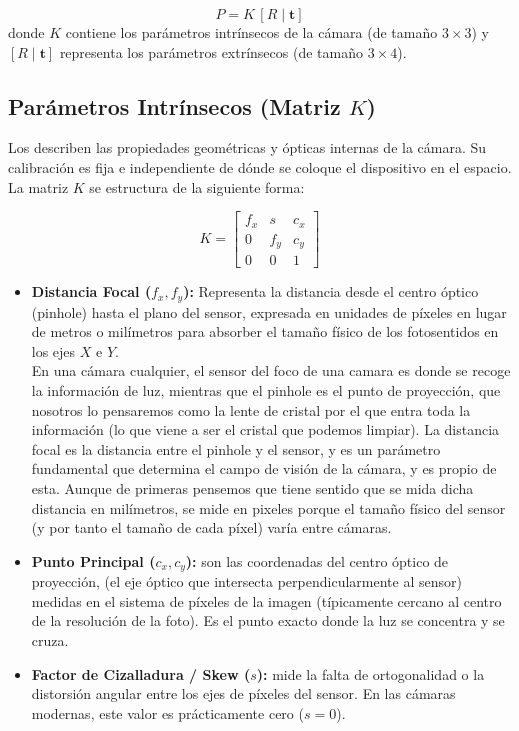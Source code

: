 $$P = K \, [R \mid \mathbf{t}]$$
donde $K$ contiene los parámetros intrínsecos de la cámara (de tamaño $3 \times 3$) y $[R \mid \mathbf{t}]$ representa los parámetros extrínsecos (de tamaño $3 \times 4$).

\subsection{Parámetros Intrínsecos (Matriz $K$)}
\noindent
Los  describen las propiedades geométricas y ópticas internas de la cámara. Su calibración es fija e independiente de dónde se coloque el dispositivo en el espacio. La matriz $K$ se estructura de la siguiente forma:

$$K = \begin{bmatrix} f_x & s & c_x \\ 0 & f_y & c_y \\ 0 & 0 & 1 \end{bmatrix}$$

\begin{itemize}
    \item \textbf{Distancia Focal ($f_x, f_y$):} Representa la distancia desde el centro óptico (pinhole) hasta el plano del sensor, expresada en unidades de píxeles en lugar de metros o milímetros para absorber el tamaño físico de los fotosentidos en los ejes $X$ e $Y$. \\
    
    \noindent
    En una cámara cualquier, el sensor del foco de una camara es donde se recoge la información de luz, mientras que el pinhole es el punto de proyección, que nosotros lo pensaremos como la lente de cristal por el que entra toda la información (lo que viene a ser el cristal que podemos limpiar). La distancia focal es la distancia entre el pinhole y el sensor, y es un parámetro fundamental que determina el campo de visión de la cámara, y es propio de esta. Aunque de primeras pensemos que tiene sentido que se mida dicha distancia en milímetros, se mide en pixeles porque el tamaño físico del sensor (y por tanto el tamaño de cada píxel) varía entre cámaras.
    \item \textbf{Punto Principal ($c_x, c_y$):} son las coordenadas del centro óptico de proyección,  (el eje óptico que intersecta perpendicularmente al sensor) medidas en el sistema de píxeles de la imagen (típicamente cercano al centro de la resolución de la foto). Es el punto exacto donde la luz se concentra y se cruza.
    \item \textbf{Factor de Cizalladura / Skew ($s$):} mide la falta de ortogonalidad o la distorsión angular entre los ejes de píxeles del sensor. En las cámaras modernas, este valor es prácticamente cero ($s = 0$).
\end{itemize}

